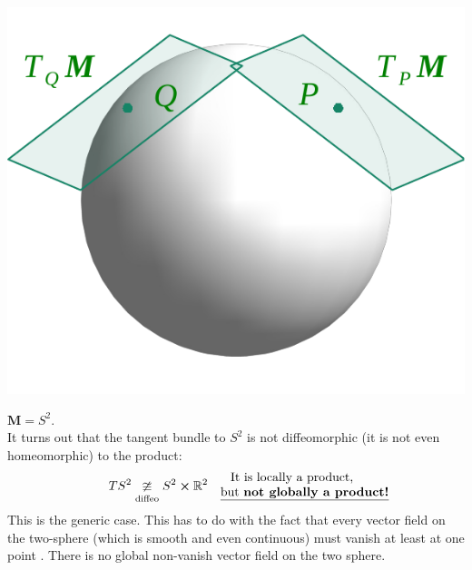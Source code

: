 \documentclass[../main.tex]{subfiles}
\begin{document}
\begin{marginfigure}[-20mm]
	\includegraphics[width=1.2\linewidth]{images/Tangent_bundles_s2.pdf}
	\caption[Tangent bundle $S^2$]{}
\end{marginfigure} 
\begin{example}
$\mathbf{M}=S^2$.\\
It turns out that the tangent bundle to $S^2$ is not diffeomorphic (it is not even homeomorphic) to the product:
\[
TS^2\underset{\textrm{diffeo}}{\ncong}S^2\cross \mathbb{R}^2 \quad 
\text{\parbox{4 cm}{\centering It is locally a product, \underline{but \textbf{not globally a product!}}}}
\]
This is the generic case. This has to do with the fact that every vector field on the two-sphere (which is smooth and even continuous) must vanish at least at one point . There is no global non-vanish vector field on the two sphere. 
\end{example}
\end{document}
